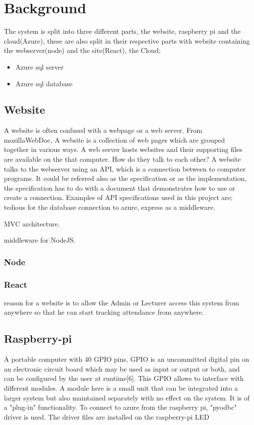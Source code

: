 \chapter{Background}
The system is split into three different parts, the website, raspberry pi and the cloud(Azure), these are also split in their respective parts with website containing the webserver(node) and the site(React), the Cloud; 
\begin{itemize}
  \item Azure sql server
  \item Azure sql database
\end{itemize}



\section{Website}
A website is often confused with a webpage or a web server. From mozillaWebDoc, A website is a collection of web pages which are grouped together in various ways. A web server hosts websites and their supporting files are available on the that computer. 
How do they talk to each other?
A website talks to the webserver using an API, which is a connection between to computer programs. It could be referred also as the specification or as the implementation, the specification has to do with a document that demonstrates how to use or create a connection. Examples of API specifications used in this project are; tedious for the database connection to azure, express as a middleware. 

MVC architecture.

middleware for NodeJS.
\subsection{Node}


\subsection{React}




reason for a website is to allow the Admin or Lecturer access this system from anywhere so that he can start tracking attendance from anywhere.

\section{Raspberry-pi}
A portable computer with 40 GPIO pins, 
GPIO is an uncommitted digital pin on an electronic circuit board which may be used as input or output or both, and can be configured by the user at runtime[6]. This GPIO allows to interface with different modules. A module here is a small unit that can be integrated into a larger system but also maintained separately with no effect on the system. It is of a "plug-in" functionality.
To connect to azure from the raspberry pi, "pyodbc" driver is used. The driver files are installed on the raspberry-pi
LED  

